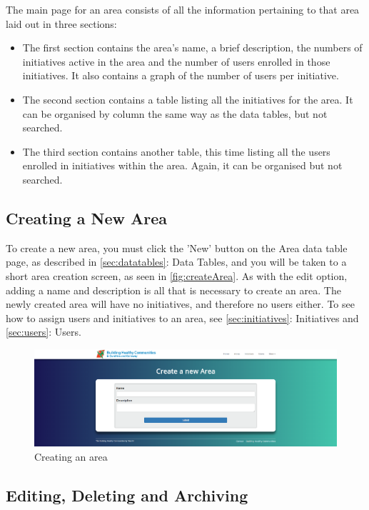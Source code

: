 \documentclass{bhcguides}
\begin{document}
The main page for an area consists of all the information pertaining to that area laid out in three sections:

\begin{itemize}
	\item The first section contains the area's name, a brief description, the numbers of initiatives active in the area and the number of users enrolled in those initiatives. It also contains a graph of the number of users per initiative.
	\item The second section contains a table listing all the initiatives for the area. It can be organised by column the same way as the data tables, but not searched.
	\item The third section contains another table, this time listing all the users enrolled in initiatives within the area. Again, it can be organised but not searched.
\end{itemize}

\subsection{Creating a New Area}
\label{ssec:createarea}

To create a new area, you must click the 'New' button on the Area data table page, as described in \autoref{sec:datatables}: Data Tables, and you will be taken to a short area creation screen, as seen in \autoref{fig:createArea}. As with the edit option, adding a name and description is all that is necessary to create an area. The newly created area will have no initiatives, and therefore no users either. To see how to assign users and initiatives to an area, see \autoref{sec:initiatives}: Initiatives and \autoref{sec:users}: Users.

\begin{figure}[h!]
 \centerline{\includegraphics[width=\textwidth, height=\textheight, keepaspectratio]{createarea.png}}
 \caption{Creating an area}
 \label{fig:createArea}
\end{figure}

\subsection{Editing, Deleting and Archiving}
\label{ssec:areaeditdelete}
\end{document}
